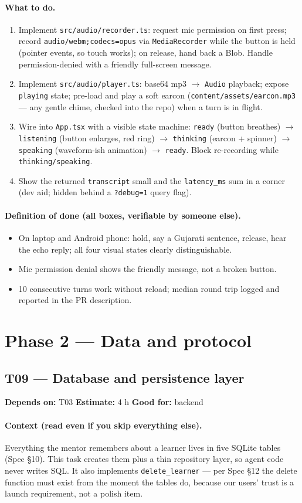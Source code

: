 \documentclass[11pt]{article}
\newcommand{\code}[1]{\texttt{#1}}
\newcommand{\taskmeta}[3]{\noindent\textbf{Depends on:} #1 \quad\textbullet\quad \textbf{Estimate:} #2 \quad\textbullet\quad \textbf{Good for:} #3\par\vspace{2pt}}
\newcommand{\ctx}[1]{\paragraph{Context (read even if you skip everything else).} #1}
\newcommand{\dod}{\paragraph{Definition of done (all boxes, verifiable by someone else).}}
\begin{document}
\paragraph{What to do.}
\begin{enumerate}
  \item Implement \code{src/audio/recorder.ts}: request mic permission on first press; record \code{audio/webm;codecs=opus} via \code{MediaRecorder} while the button is held (pointer events, so touch works); on release, hand back a Blob. Handle permission-denied with a friendly full-screen message.
  \item Implement \code{src/audio/player.ts}: base64 mp3 \(\rightarrow\) \code{Audio} playback; expose \code{playing} state; pre-load and play a soft earcon (\code{content/assets/earcon.mp3} --- any gentle chime, checked into the repo) when a turn is in flight.
  \item Wire into \code{App.tsx} with a visible state machine: \code{ready} (button breathes) \(\rightarrow\) \code{listening} (button enlarges, red ring) \(\rightarrow\) \code{thinking} (earcon + spinner) \(\rightarrow\) \code{speaking} (waveform-ish animation) \(\rightarrow\) \code{ready}. Block re-recording while \code{thinking/speaking}.
  \item Show the returned \code{transcript} small and the \code{latency\_ms} sum in a corner (dev aid; hidden behind a \code{?debug=1} query flag).
\end{enumerate}
\dod
\begin{itemize}
  \item On laptop and Android phone: hold, say a Gujarati sentence, release, hear the echo reply; all four visual states clearly distinguishable.
  \item Mic permission denial shows the friendly message, not a broken button.
  \item 10 consecutive turns work without reload; median round trip logged and reported in the PR description.
\end{itemize}

\section{Phase 2 --- Data and protocol}

\subsection{T09 --- Database and persistence layer \dag}
\taskmeta{T03}{4 h}{backend}
\ctx{Everything the mentor remembers about a learner lives in five SQLite tables (Spec \S10). This task creates them plus a thin repository layer, so agent code never writes SQL. It also implements \code{delete\_learner} --- per Spec \S12 the delete function must exist from the moment the tables do, because our users' trust is a launch requirement, not a polish item.}
\end{document}
